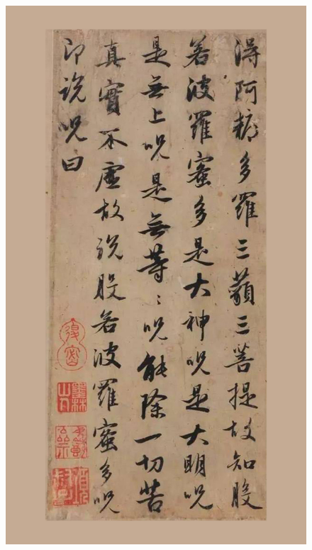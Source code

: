 \documentclass[a4paper,twoside]{article}
\begin{document}
\begin{figure}[ht]
\centering
\includegraphics[width=13.2cm]{images/zhaomengfu-4}
\end{figure}
\end{document}
